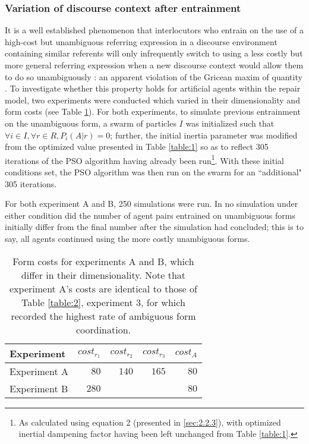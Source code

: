 \documentclass[12pt,a4paper]{article}
\begin{document}
\subsubsection{Variation of discourse context after entrainment}
It is a well established phenomenon that interlocutors who entrain on the use of a high-cost but unambiguous referring expression in a discourse environment containing similar referents will only infrequently switch to using a less costly but more general referring expression when a new discourse \mbox{context} would allow them to do so unambiguously \citep{brennan1996}: an apparent violation of the Gricean maxim of quantity \citep{grice1975}. To investigate whether this property holds for artificial agents within the repair model, two experiments were conducted which varied in their dimensionality and form costs (see Table \ref{table:4}). For both experiments, to simulate previous entrainment on the unambiguous form, a swarm of particles $I$ was initialized such that $\forall i \in I, \forall r \in R, P_i(A|r) = 0$; further, the initial inertia parameter was modified from the optimized value presented in Table \ref{table:1} so as to reflect 305 iterations of the PSO algorithm having already been run\footnote{As calculated using equation 2 (presented in \ref{sec:2.2.3}), with optimized inertial dampening factor having been left unchanged from Table \ref{table:1}.}. With these initial conditions set, the PSO algorithm was then run on the swarm for an ``additional" 305 iterations.

For both experiment A and B, 250 simulations were run. In no simulation under either condition did the number of agent pairs entrained on unambiguous forms initially differ from the final number after the simulation had concluded; this is to say, all agents continued using the more costly unambiguous forms.

\begin{table}
\begin{center}
    \begin{tabular}{ l r r r r }
    Experiment & $cost_{r_1}$ & $cost_{r_2}$ & $cost_{r_3}$ & $cost_A$\\ \hline
    Experiment A & $80$  & $140$ & $165$ & $80$ \\ \hline
    Experiment B & $280$ &       &       & $80$ \\ \hline
    \end{tabular}
    \caption{Form costs for experiments A and B, which differ in their dimensionality. Note that experiment A's costs are identical to those of Table \ref{table:2}, experiment 3, for which \citeauthor{rohde2012} recorded the highest rate of ambiguous form coordination.}
    \label{table:4}
\end{center}
\end{table}
\end{document}
